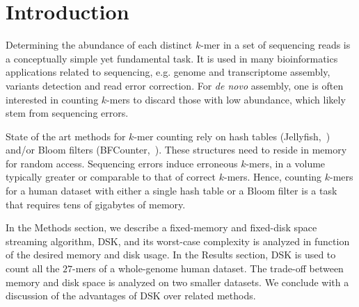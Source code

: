 \documentclass{bioinfo}
\newcommand{\dsk}{DSK\xspace}
\newcommand{\jelly}{Jellyfish\xspace}
\newcommand{\bfc}{BFCounter\xspace}
\begin{document}
\section{Introduction}
Determining the abundance of each distinct $k$-mer in a set of sequencing reads is a conceptually simple yet fundamental task. It is used in many bioinformatics applications related to sequencing, e.g. genome and transcriptome assembly, variants detection and read error correction. For \emph{de novo} assembly, one is often interested in counting $k$-mers to discard those with low abundance, which likely stem from sequencing errors.

State of the art methods for $k$-mer counting rely on hash tables (\jelly,~\cite{jellyfish}) and/or Bloom filters (\bfc,~\cite{bfcounter}). These structures need to reside in memory for random access. Sequencing errors induce erroneous $k$-mers, in a volume typically greater or comparable to that of correct $k$-mers. Hence, counting $k$-mers for a human dataset with either a single hash table or a Bloom filter is a task that requires tens of gigabytes of memory.%

In the Methods section, we describe a fixed-memory and fixed-disk space streaming algorithm, \dsk, and its worst-case complexity is analyzed in function of the desired memory and disk usage. In the Results section, \dsk is used to count all the $27$-mers of a whole-genome human dataset. The trade-off between memory and disk space is analyzed on two smaller datasets. 
We conclude with a discussion of the advantages of \dsk over related methods.

\end{document}
